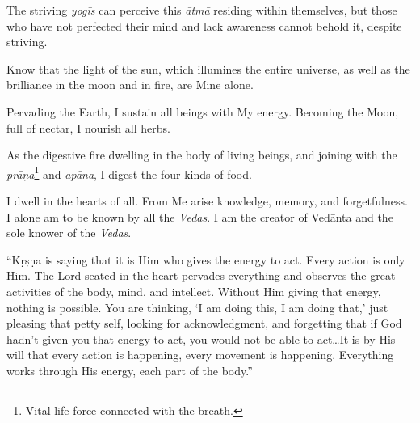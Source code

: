 {The striving \textit{yogīs} can perceive this \textit{ātmā} residing within themselves, but those who have not perfected their mind and lack awareness cannot behold it, despite striving.}

{Know that the light of the sun, which illumines the entire universe, as well as the brilliance in the moon and in fire, are Mine alone.}

{Pervading the Earth, I sustain all beings with My energy. Becoming the Moon, full of nectar, I nourish all herbs.}

{As the digestive fire dwelling in the body of living beings, and joining with the \textit{prāṇa}\footnote{Vital life force connected with the breath.} and \textit{apāna}, I digest the four kinds of food.}

{I dwell in the hearts of all. From Me arise knowledge, memory, and forgetfulness. I alone am to be known by all the \textit{Vedas}. I am the creator of Vedānta and the sole knower of the \textit{Vedas}.}

\enquote{Kṛṣṇa is saying that it is Him who gives the energy to act. Every action is only Him. The Lord seated in the heart pervades everything and observes the great activities of the body, mind, and intellect. Without Him giving that energy, nothing is possible. You are thinking, \enquote{I am doing this, I am doing that,} just pleasing that petty self, looking for acknowledgment, and forgetting that if God hadn’t given you that energy to act, you would not be able to act\ldots It is by His will that every action is happening, every movement is happening. Everything works through His energy, each part of the body.}

